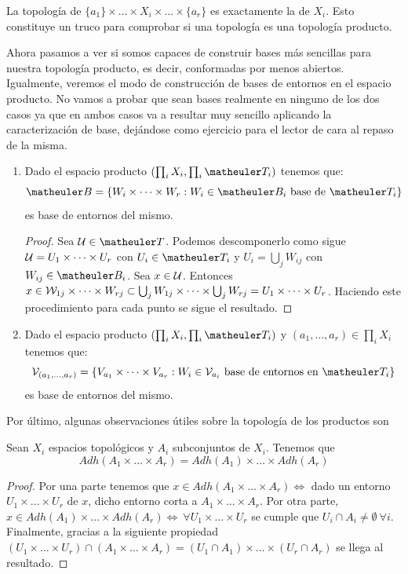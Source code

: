 \begin{obs}[Consecuencias]
	La topología de $\{a_1\}\times\dots\times X_i \times \dots \times\{a_r\}$ es exactamente la de $X_i$. Esto constituye un truco para comprobar si una topología es una topología producto.
\end{obs}
	

Ahora pasamos a ver si somos capaces de construir bases más sencillas para nuestra topología producto, es decir, conformadas por menos abiertos. Igualmente, veremos el modo de construcción de bases de entornos en el espacio producto. No vamos a probar que sean bases realmente en ninguno de los dos casos ya que en ambos casos va a resultar muy sencillo aplicando la caracterización de base, dejándose como ejercicio para el lector de cara al repaso de la misma.
\begin{enumerate}
	\item Dado el espacio producto $(\prod_iX_i,\prod_i\T_i)$ tenemos que: \[\B=\{W_i\times\cdots\times W_r:W_i\in \B_i \text{ base de }\T_i\}\] es base de entornos del mismo.
	\begin{proof}
		Sea $\U \in \T$. Podemos descomponerlo como sigue $\mathcal{U} =U_1 \times \dots \times U_r $ con $U_i \in \T_i$ y $U_i = \bigcup_j W_{ij}$ con $W_{ij} \in \B_i$. Sea $x \in \mathcal{U}$. Entonces $x \in \mathcal{W}_{1j} \times \dots \times W_{rj} \subset \bigcup_j W_{1j} \times \dots \times \bigcup_j W_{rj} = U_1 \times \dots \times U_r$. Haciendo este procedimiento para cada punto se sigue el resultado.
	\end{proof}

	\item Dado el espacio producto $(\prod_iX_i,\prod_i\T_i)$ y $(a_1,\dots,a_r)\in\prod_iX_i$ tenemos que: \[\V_{(a_1,\dots,a_r)}=\{V_{a_1}\times\cdots\times V_{a_r}:W_i\in \V_{a_i} \text{ base de entornos en } \T_i\} \] es base de entornos del mismo.
\end{enumerate}

Por último, algunas observaciones útiles sobre la topología de los productos son
\begin{prop}[Adherencia]
	Sean $X_i$ espacios topológicos y $A_i$ subconjuntos de $X_i$. Tenemos que
	\[Adh(A_1 \times \dots \times A_r) = Adh(A_1) \times \dots \times Adh(A_r)\]
\end{prop}
\begin{proof}
	 Por una parte tenemos que $x \in Adh(A_1 \times \dots \times A_r) \iff$ dado un entorno $U_1 \times \dots \times U_r$ de $x$, dicho entorno corta a $A_1 \times \dots \times A_r$.
	 Por otra parte, $x \in  Adh(A_1) \times \dots \times Adh(A_r) \iff \ \forall U_1 \times \dots \times U_r $ se cumple que $U_i \cap A_i \neq \emptyset \ \forall i$.
	 Finalmente, gracias a la siguiente propiedad $(U_1 \times \dots \times U_r) \cap (A_1 \times \dots \times A_r) = (U_1 \cap A_1) \times \dots \times (U_r \cap A_r)$ se llega al resultado.
\end{proof}

